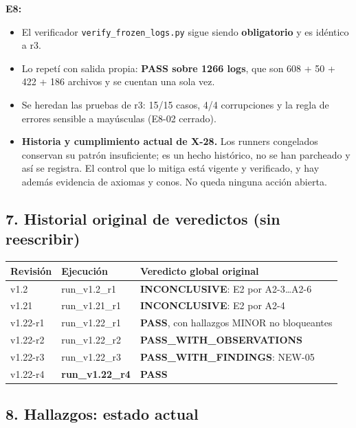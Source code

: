\documentclass[
]{article}
\newcounter{none} %
\providecommand{\tightlist}{%
  \setlength{\itemsep}{0pt}\setlength{\parskip}{0pt}}
\begin{document}
\textbf{E8:}

\begin{itemize}
\tightlist
\item
  El verificador \texttt{verify\_frozen\_logs.py} sigue siendo
  \textbf{obligatorio} y es idéntico a r3.
\item
  Lo repetí con salida propia: \textbf{PASS sobre 1266 logs}, que son
  608 + 50 + 422 + 186 archivos y se cuentan una sola vez.
\item
  Se heredan las pruebas de r3: 15/15 casos, 4/4 corrupciones y la regla
  de errores sensible a mayúsculas (E8-02 cerrado).
\item
  \textbf{Historia y cumplimiento actual de X-28.} Los runners
  congelados conservan su patrón insuficiente; es un hecho histórico, no
  se han parcheado y así se registra. El control que lo mitiga está
  vigente y verificado, y hay además evidencia de axiomas y conos. No
  queda ninguna acción abierta.
\end{itemize}

\subsection{7. Historial original de veredictos (sin
reescribir)}\label{7-historial-original-de-veredictos-sin-reescribir}

{\def\LTcaptype{none} %
\begin{longtable}[]{@{}lll@{}}
\toprule\noalign{}
Revisión & Ejecución & Veredicto global original \\
\midrule\noalign{}
\endhead
\bottomrule\noalign{}
\endlastfoot
v1.2 & run\_v1.2\_r1 & \textbf{INCONCLUSIVE}: E2 por A2-3\ldots A2-6 \\
v1.21 & run\_v1.21\_r1 & \textbf{INCONCLUSIVE}: E2 por A2-4 \\
v1.22-r1 & run\_v1.22\_r1 & \textbf{PASS}, con hallazgos MINOR no
bloqueantes \\
v1.22-r2 & run\_v1.22\_r2 & \textbf{PASS\_WITH\_OBSERVATIONS} \\
v1.22-r3 & run\_v1.22\_r3 & \textbf{PASS\_WITH\_FINDINGS}: NEW-05 \\
v1.22-r4 & \textbf{run\_v1.22\_r4} & \textbf{PASS} \\
\end{longtable}
}

\subsection{8. Hallazgos: estado
actual}\label{8-hallazgos-estado-actual}
\end{document}
